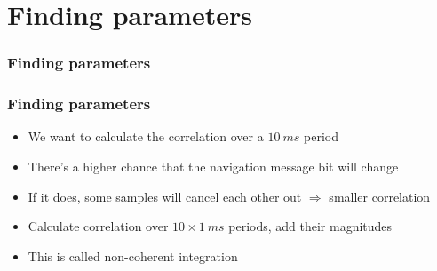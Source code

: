 \documentclass[aspectratio=169]{beamer}
\begin{document}
\section{Finding parameters}

\begin{frame}
    \frametitle{Finding parameters}

    \centering
\end{frame}

\begin{frame}
    \frametitle{Finding parameters}

    \begin{itemize}
        \item<2-> We want to calculate the correlation over a $\qty{10}{ms}$ period
        
        \item<3-> There's a higher chance that the navigation message bit will change
        
        \item<4-> If it does, some samples will cancel each other out $\Rightarrow$ smaller correlation
        
        \item<5-> Calculate correlation over $10 \times \qty{1}{ms}$ periods, add their magnitudes
        
        \item<6-> This is called non-coherent integration
    \end{itemize}
\end{frame}
\end{document}
